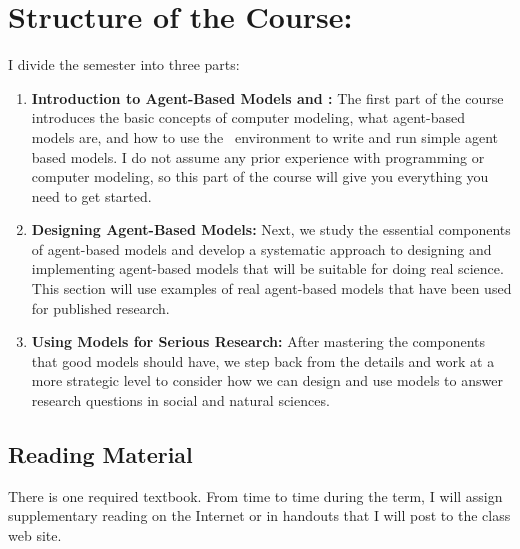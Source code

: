 \documentclass[11pt,twoside]{jgsyllabus}\usepackage[]{graphicx}\usepackage[]{color}
\begin{document}
\iffalse
\section[Goals]{Goals for the Course}
My goals for this course are that at the end of the semester:
\begin{itemize}
    \item
\end{itemize}
\fi
%
%
%
\section[Structure]{Structure of the Course:}
I divide the semester into three parts:
\begin{enumerate}
    \item \textbf{Introduction to Agent-Based Models and \NetLogo:} The first
    part of the course introduces the basic concepts of computer modeling, what
    agent-based models are, and how to use the \NetLogo\ environment to write
    and run simple agent based models. I do not assume any prior experience with
    programming or computer modeling, so this part of the course will give you
    everything you need to get started.
    \item \textbf{Designing Agent-Based Models:} Next, we study the essential
    components of agent-based models and develop a systematic approach to
    designing and implementing agent-based models that will be suitable for
    doing real science. This section will use examples of real agent-based
    models that have been used for published research.
    \item \textbf{Using Models for Serious Research:} After mastering the
    components that good models should have, we step back from the details and
    work at a more strategic level to consider how we can design  and use models
    to answer research questions in social and natural sciences.
\end{enumerate}
%
%
%
\pagebreak
\subsection{Reading Material}
There is one required textbook.
From time to time during the term, I will assign supplementary reading on the
Internet or in handouts that I will post to the class web site.
\end{document}
